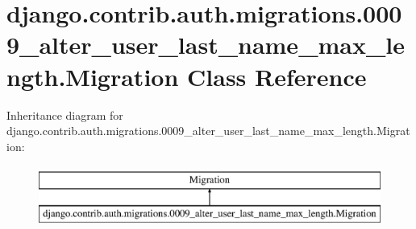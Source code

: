 \hypertarget{classdjango_1_1contrib_1_1auth_1_1migrations_1_10009__alter__user__last__name__max__length_1_1_migration}{}\section{django.\+contrib.\+auth.\+migrations.0009\+\_\+alter\+\_\+user\+\_\+last\+\_\+name\+\_\+max\+\_\+length.Migration Class Reference}
\label{classdjango_1_1contrib_1_1auth_1_1migrations_1_10009__alter__user__last__name__max__length_1_1_migration}
Inheritance diagram for django.\+contrib.\+auth.\+migrations.0009\+\_\+alter\+\_\+user\+\_\+last\+\_\+name\+\_\+max\+\_\+length.Migration\+:\begin{figure}[H]
\begin{center}
\leavevmode
\includegraphics[height=2.000000cm]{classdjango_1_1contrib_1_1auth_1_1migrations_1_10009__alter__user__last__name__max__length_1_1_migration}
\end{center}
\end{figure}
